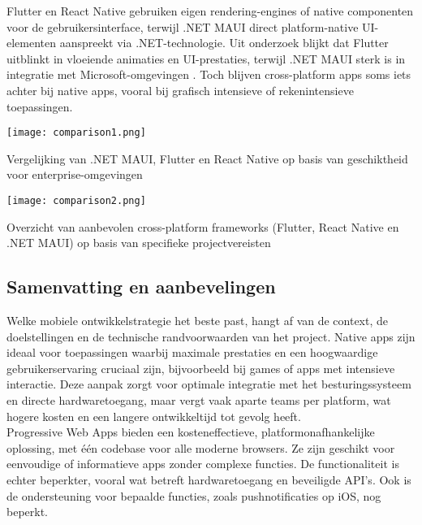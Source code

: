Flutter en React Native gebruiken eigen rendering-engines of native componenten voor de gebruikersinterface, terwijl .NET MAUI direct platform-native UI-elementen aanspreekt via .NET-technologie. Uit onderzoek blijkt dat Flutter uitblinkt in vloeiende animaties en UI-prestaties, terwijl .NET MAUI sterk is in integratie met Microsoft-omgevingen \autocite{Gajjam2025}. Toch blijven cross-platform apps soms iets achter bij native apps, vooral bij grafisch intensieve of rekenintensieve toepassingen.

\begin{table}[h]
    \centering
    \texttt{[image: comparison1.png]}
    \caption[Integratie]{Vergelijking van .NET MAUI, Flutter en React Native op basis van geschiktheid voor enterprise-omgevingen \autocite{Gajjam2025}}
    \label{fig:vergelijking}
\end{table}

\begin{table}[h]
    \centering
    \texttt{[image: comparison2.png]}
    \caption[Frameworkkeuze]{Overzicht van aanbevolen cross-platform frameworks (Flutter, React Native en .NET MAUI) op basis van specifieke projectvereisten \autocite{Gajjam2025}}
    \label{tab:frameworkkeuze}
\end{table}

\subsection{Samenvatting en aanbevelingen}
Welke mobiele ontwikkelstrategie het beste past, hangt af van de context, de doelstellingen en de technische randvoorwaarden van het project. Native apps zijn ideaal voor toepassingen waarbij maximale prestaties en een hoogwaardige gebruikerservaring cruciaal zijn, bijvoorbeeld bij games of apps met intensieve interactie. Deze aanpak zorgt voor optimale integratie met het besturingssysteem en directe hardwaretoegang, maar vergt vaak aparte teams per platform, wat hogere kosten en een langere ontwikkeltijd tot gevolg heeft.\\

Progressive Web Apps bieden een kosteneffectieve, platformonafhankelijke oplossing, met één codebase voor alle moderne browsers. Ze zijn geschikt voor eenvoudige of informatieve apps zonder complexe functies. De functionaliteit is echter beperkter, vooral wat betreft hardwaretoegang en beveiligde API’s. Ook is de ondersteuning voor bepaalde functies, zoals pushnotificaties op iOS, nog beperkt.\\

